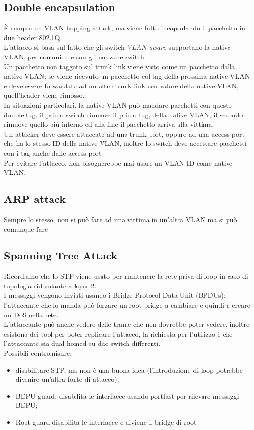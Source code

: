 \documentclass[12pt, oneside]{extbook} %
\begin{document}
\subsection{Double encapsulation}
È sempre un VLAN hopping attack, ma viene fatto incapsulando il pacchetto in due header 802.1Q.
\\L'attacco si basa sul fatto che gli switch \textit{VLAN aware} supportano la native VLAN, per comunicare con gli unaware switch.
\\Un pacchetto non taggato sul trunk link viene visto come un pacchetto dalla native VLAN: se viene ricevuto un pacchetto col tag della prossima native VLAN e deve essere forwardato ad un altro trunk link con valore della native VLAN, quell'header viene rimosso.
\\In situazioni particolari, la native VLAN può mandare pacchetti con questo double tag: il primo switch rimuove il primo tag, della native VLAN, il secondo rimuove quello più interno ed alla fine il pacchetto arriva alla vittima.
\\Un attacker deve essere attaccato ad una trunk port, oppure ad una access port che ha lo stesso ID della native VLAN, inoltre lo switch deve accettare pacchetti con i tag anche dalle access port.
\\Per evitare l'attacco, non bisognerebbe mai usare un VLAN ID come native VLAN.

\subsection{ARP attack}
Sempre lo stesso, non si può fare ad una vittima in un'altra VLAN ma si può comunque fare

\subsection{Spanning Tree Attack}
Ricordiamo che lo STP viene usato per mantenere la rete priva di loop in caso di topologia ridondante a layer 2.
\\I messaggi vengono inviati usando i Bridge Protocol Data Unit (BPDUs): l'attaccante che lo manda può forzare un root bridge a cambiare e quindi a creare un DoS nella rete.
\\L'attaccante può anche vedere delle trame che non dovrebbe poter vedere, inoltre esistono dei tool per poter replicare l'attacco, la richiesta per l'utilizzo è che l'attaccante sia dual-homed su due switch differenti.
\\Possibili contromisure:
\begin{itemize}
    \item disabilitare STP, ma non è una buona idea (l'introduzione di loop potrebbe divenire un'altra fonte di attacco);
    \item BDPU guard: disabilita le interfacce usando portfast per rilevare messaggi BDPU;
    \item Root guard disabilita le interfacce e diviene il bridge di root
\end{itemize}
\end{document}
